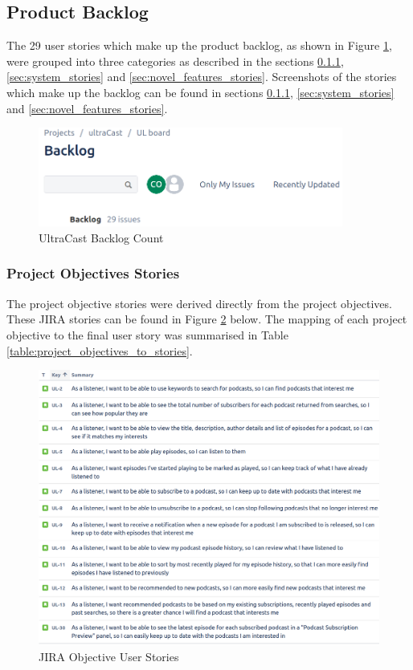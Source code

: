 \documentclass[12pt]{article}
\begin{document}
\subsection{Product Backlog}

The 29 user stories which make up the product backlog, as shown in Figure \ref{fig:backlog}, were grouped into three categories as described in the sections \ref{sec:project_objectives_stories}, \ref{sec:system_stories} and \ref{sec:novel_features_stories}.
Screenshots of the stories which make up the backlog can be found in sections \ref{sec:project_objectives_stories}, \ref{sec:system_stories} and \ref{sec:novel_features_stories}.

\begin{figure}[ht]
    \centering
    \includegraphics[width=10cm]{resources/project_backlog}
    \caption{UltraCast Backlog Count}
    \label{fig:backlog}
\end{figure}

\subsubsection{Project Objectives Stories} \label{sec:project_objectives_stories}

The project objective stories were derived directly from the project objectives. These JIRA stories can be found in Figure \ref{fig:jira_stories} below.
The mapping of each project objective to the final user story was summarised in Table \ref{table:project_objectives_to_stories}.

\newpage

\begin{figure}[h]
    \centering
    \includegraphics[width=\textwidth]{resources/objective_stories}
    \caption{JIRA Objective User Stories}
    \label{fig:jira_stories}
\end{figure}
\end{document}
